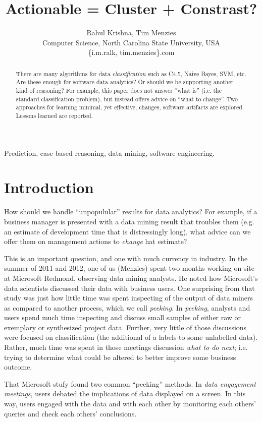 \documentclass[conference]{IEEEtran}
\title{Actionable = Cluster + Constrast?}
\author{Rahul Krishna, Tim Menzies\\
	Computer Science, North Carolina State University, USA\\
	\{i.m.ralk, tim.menzies\}\@gmail.com
	
}
\begin{document}
	\maketitle
	\begin{abstract}
		There are many
		algorithms for data {\em classification} such as  C4.5, Naive Bayes, SVM, etc.
		Are these enough for software data analytics? Or should we be supporting
		another kind of reasoning? For example, this paper does not answer 
		``what is'' (i.e. the standard classification problem), but instead  offers advice on ``what to change''.
		Two approaches for learning minimal, yet effective,  changes,  software
		artifacts are explored. Lessons learned are reported.
	\end{abstract}
	\begin{IEEEkeywords}
		Prediction, case-based reasoning, data mining, software engineering.
	\end{IEEEkeywords}
	
	\section{Introduction} 
	How should we handle ``unpopulular'' results
	for data analytics? For example, if a business manager is presented
	with a data mining result that troubles them (e.g. an estimate of
	development time that is distressingly long), what advice
	can we offer them on management actions to {\em change} hat estimate?
	
	This is an important question, and one with much currency in industry.
	In the summer of 2011 and 2012, one of us (Menzies) spent two months
	working on-site at Microsoft Redmond,
	observing data mining analysts.  He
	noted how Microsoft's data scientists
	discussed their data with  business users. 
	One surprising from that study was just how
	little time was spent  
	inspecting  of the output of data miners as compared to another process, which we call {\em peeking}.
	In {\em peeking}, analysts and users spend much time
	inspecting and discuss small samples of either raw or exemplary or synthesized project data.  Further, very little of those discussions were  focused on classification
	(the additional of a labels to some unlabelled data). Rather, much time
	was spent in those meetings discussion {\em what to do next}; i.e. trying
	to determine what could be altered to better improve some business outcome.
	
	That   Microsoft  stufy found two common ``peeking'' methods.
	In {\em data engagement meetings},
	users debated the implications of data
	displayed on a screen. In this way, users
	engaged with the data and with each other by
	monitoring each others' queries and check each others'
	conclusions.
	
\end{document}
